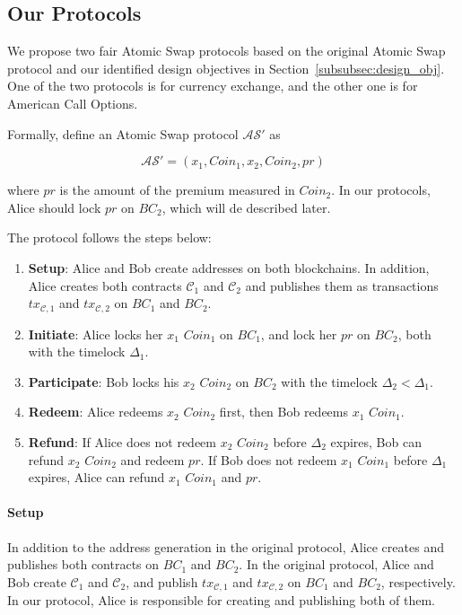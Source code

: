 \subsection{Our Protocols}

We propose two fair Atomic Swap protocols based on the original Atomic Swap protocol and our identified design objectives in Section~\ref{subsubsec:design_obj}.
One of the two protocols is for currency exchange, and the other one is for American Call Options.

Formally, define an Atomic Swap protocol $\mathcal{AS}'$ as

$$\mathcal{AS}' = (x_1, Coin_1, x_2, Coin_2, pr)$$

where $pr$ is the amount of the premium measured in $Coin_2$.
In our protocols, Alice should lock $pr$ on $BC_2$, which will de described later.

The protocol follows the steps below:

\begin{enumerate}
    \item \textbf{Setup}: Alice and Bob create addresses on both blockchains.
    In addition, Alice creates both contracts $\mathcal{C}_1$ and $\mathcal{C}_2$ and publishes them as transactions $tx_{\mathcal{C}, 1}$ and $tx_{\mathcal{C}, 2}$ on $BC_1$ and $BC_2$. 
    \item \textbf{Initiate}: Alice locks her $x_1$ $Coin_1$ on $BC_1$, and lock her $pr$ on $BC_2$, both with the timelock $\Delta_1$.
    \item \textbf{Participate}: Bob locks his $x_2$ $Coin_2$ on $BC_2$ with the timelock $\Delta_2 < \Delta_1$.
    \item \textbf{Redeem}: Alice redeems $x_2$ $Coin_2$ first, then Bob redeems $x_1$ $Coin_1$.
    \item \textbf{Refund}: If Alice does not redeem $x_2$ $Coin_2$ before $\Delta_2$ expires, Bob can refund $x_2$ $Coin_2$ and redeem $pr$.
    If Bob does not redeem $x_1$ $Coin_1$ before $\Delta_1$ expires, Alice can refund $x_1$ $Coin_1$ and $pr$.
\end{enumerate}

\paragraph{Setup}
In addition to the address generation in the original protocol,
Alice creates and publishes both contracts on $BC_1$ and $BC_2$.
In the original protocol, Alice and Bob create $\mathcal{C}_1$ and $\mathcal{C}_2$, and publish $tx_{\mathcal{C}, 1}$ and $tx_{\mathcal{C}, 2}$ on $BC_1$ and $BC_2$, respectively.
In our protocol, Alice is responsible for creating and publishing both of them.

